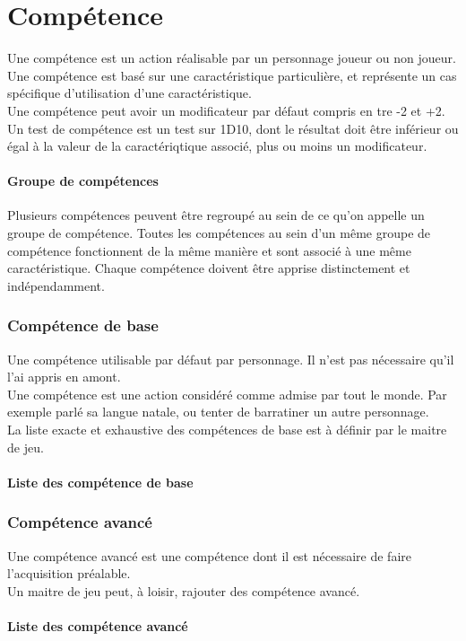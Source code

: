 \part{Compétence}

Une compétence est un action réalisable par un personnage joueur ou non joueur. \\
Une compétence est basé sur une caractéristique particulière, et représente un cas spécifique d'utilisation d'une caractéristique. \\
Une compétence peut avoir un modificateur par défaut compris en tre -2 et +2. \\
Un test de compétence est un test sur 1D10, dont le résultat doit être inférieur ou égal à la valeur de la caractériqtique associé, plus ou moins un modificateur. \\

\subsection{Groupe de compétences}
Plusieurs compétences peuvent être regroupé au sein de ce qu'on appelle un groupe de compétence. Toutes les compétences au sein d'un même groupe de compétence fonctionnent de la même manière et sont associé à une même caractéristique. Chaque compétence doivent être apprise distinctement et indépendamment.

\section{Compétence de base}
Une compétence utilisable par défaut par personnage. Il n'est pas nécessaire qu'il l'ai appris en amont. \\
Une compétence est une action considéré comme admise par tout le monde. Par exemple parlé sa langue natale, ou tenter de barratiner un autre personnage. \\
La liste exacte et exhaustive des compétences de base est à définir par le maitre de jeu.
 
\subsection{Liste des compétence de base}

\section{Compétence avancé}
Une compétence avancé est une compétence dont il est nécessaire de faire l'acquisition préalable. \\
Un maitre de jeu peut, à loisir, rajouter des compétence avancé. \\ 

\subsection{Liste des compétence avancé}